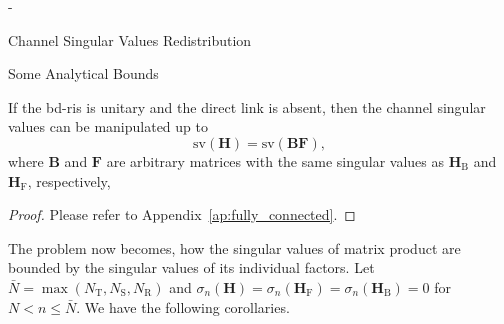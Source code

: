 \begin{section}{-}
\begin{subsection}{Channel Singular Values Redistribution}
\begin{subsubsection}{Some Analytical Bounds}
			\begin{proposition}\label{pp:fully_connected}
				If the \gls{bd}-\gls{ris} is unitary and the direct link is absent, then the channel singular values can be manipulated up to
				\begin{equation}
					\mathrm{sv}(\mathbf{H}) = \mathrm{sv}(\mathbf{BF}),
				\end{equation}
				where $\mathbf{B}$ and $\mathbf{F}$ are arbitrary matrices with the same singular values as $\mathbf{H}_\mathrm{B}$ and $\mathbf{H}_\mathrm{F}$, respectively,
			\end{proposition}

			\begin{proof}
				Please refer to Appendix~\ref{ap:fully_connected}.
			\end{proof}

			The problem now becomes, how the singular values of matrix product are bounded by the singular values of its individual factors.
			Let $\bar{N} = \max(N_\mathrm{T},N_\mathrm{S},N_\mathrm{R})$ and $\sigma_n(\mathbf{H})=\sigma_n(\mathbf{H}_\mathrm{F})=\sigma_n(\mathbf{H}_\mathrm{B})=0$ for $N < n \le \bar{N}$.
			We have the following corollaries.


\end{subsubsection}
\end{subsection}
\end{section}
